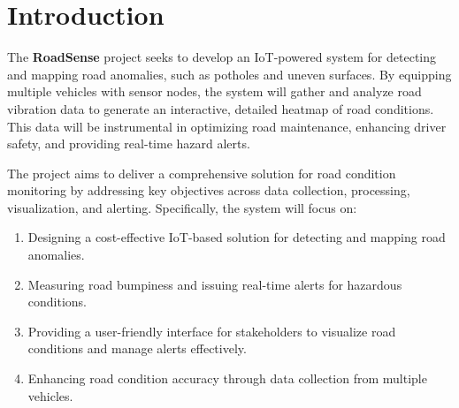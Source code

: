 \section{Introduction}

The \textbf{RoadSense} project seeks to develop an IoT-powered system for detecting and mapping road anomalies, such as potholes and uneven surfaces. By equipping multiple vehicles with sensor nodes, the system will gather and analyze road vibration data to generate an interactive, detailed heatmap of road conditions. This data will be instrumental in optimizing road maintenance, enhancing driver safety, and providing real-time hazard alerts.

The project aims to deliver a comprehensive solution for road condition monitoring by addressing key objectives across data collection, processing, visualization, and alerting. Specifically, the system will focus on:

\begin{enumerate}[label=\arabic*.]
    \item Designing a cost-effective IoT-based solution for detecting and mapping road anomalies.
    \item Measuring road bumpiness and issuing real-time alerts for hazardous conditions.
    \item Providing a user-friendly interface for stakeholders to visualize road conditions and manage alerts effectively.
    \item Enhancing road condition accuracy through data collection from multiple vehicles.
\end{enumerate}
